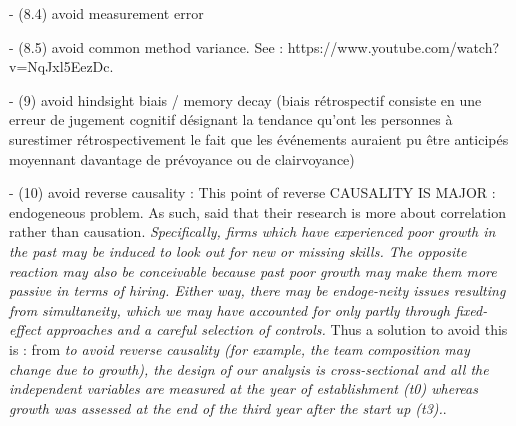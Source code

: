 \begin{itemize}
\begin{itemize}
- (8.4) avoid measurement error\newline

- (8.5) avoid common method variance. See : https://www.youtube.com/watch?v=NqJxl5EezDc. \newline

- (9) avoid hindsight biais / memory decay (biais rétrospectif consiste en une erreur de jugement cognitif désignant la tendance qu'ont les personnes à surestimer rétrospectivement le fait que les événements auraient pu être anticipés moyennant davantage de prévoyance ou de clairvoyance)\newline

- (10) avoid reverse causality : This point of reverse CAUSALITY IS MAJOR : endogeneous problem. As such, \citet{grillitsch2020does} said that their research is more about correlation rather than causation. \textit{Specifically, firms which have experienced poor growth in the past may be induced to look out for new or missing skills. The opposite reaction may also be conceivable because past poor growth may make them more passive in terms of hiring. Either way, there may be endoge-neity issues resulting from simultaneity, which we may have accounted for only partly through fixed-effect approaches and a careful selection of controls.} Thus a solution to avoid this is : from \citep{visintin2014founding} \textit{to avoid reverse causality (for example, the team composition may change due to growth), the design of our analysis is cross-sectional and all the independent variables are measured at the year of establishment (t0) whereas growth was assessed at the end of the third year after the start up (t3).}.\\


\end{itemize}
\end{itemize}
